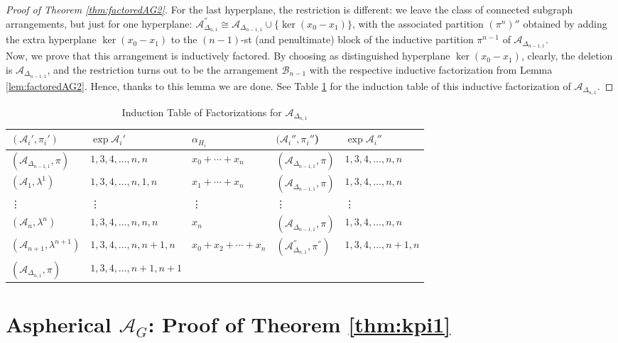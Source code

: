 \documentclass[12pt]{amsart}
\newcommand\CA{{\mathscr A}}
\newcommand\CB{{\mathscr B}}
\numberwithin{equation}{section}
\theoremstyle{plain}
\theoremstyle{definition}
\begin{document}
\begin{proof}[Proof of Theorem \ref{thm:factoredAG2}]
	For the last hyperplane, the restriction is different: we leave the class of connected subgraph arrangements, but just for one hyperplane: $\CA_{\Delta_{n,1}}^{''} \cong \CA_{\Delta_{n-1,1}} \cup \{\ker(x_0-x_1)\}$, with the associated partition $(\pi^n)''$ obtained by adding the extra hyperplane $\ker(x_0-x_1)$ to the $(n-1)$-st (and penultimate) block of the inductive partition $\pi^{n-1}$ of $\CA_{\Delta_{n-1,1}}$. \\

	Now, we prove that this arrangement is inductively factored. By choosing as distinguished hyperplane $\ker(x_0-x_1)$, clearly, the deletion is  $\CA_{\Delta_{n-1,1}}$, and the restriction turns out to be the arrangement $\CB_{n-1}$ with the respective inductive factorization from Lemma \ref{lem:factoredAG2}. Hence, thanks to this lemma  we are done. See Table \ref{table1} for the induction table of this inductive factorization of $\CA_{\Delta_{n,1}}$.
\end{proof}

	\begin{table}[ht!b]
		\renewcommand{\arraystretch}{1.5}
		\begin{tabular}{lllll}\hline
			$(\CA_i',\pi_i')$ &  $\exp\CA_i'$ & $\alpha_{H_i}$ & $(\CA_i'', \pi_i''$) & $\exp\CA_i''$\\
			\hline\hline
			$(\CA_{\Delta_{n-1,1}},\pi)$ &  $1,3,4, \ldots, n, n$ &  $x_0+\cdots +x_n$ & $(\CA_{\Delta_{n-1,1}},\pi)$ & $1,3,4,\ldots, n,n$ \\
			$(\CA_1,\lambda^{1})$ &  $1,3,4, \ldots, n, 1,n$ &  $x_1+\cdots +x_n$ & $(\CA_{\Delta_{n-1,1}},\pi)$ & $1,3,4,\ldots, n,n$ \\
			\vdots & \vdots & \vdots & \vdots & \vdots \\
			$(\CA_n,\lambda^{n})$ &  $1,3,4, \ldots, n,n,n$ &  $x_n$ & $(\CA_{\Delta_{n-1,1}},\pi)$ & $1,3,4,\ldots, n,n$ \\
			$(\CA_{n+1},\lambda^{n+1})$ &  $1,3,4, \ldots, n, n+1,n$ &  $x_0+x_2+\cdots +x_n$ & $(\CA_{\Delta_{n,1}}^{''},\pi^{''})$ & $1,3,4,\ldots, n+1,n$ \\
			$(\CA_{\Delta_{n,1}},\pi)$ &  $1,3,4, \ldots, n+1, n+1$ & & &  \\

			\hline
		\end{tabular}
		\smallskip
		\caption{Induction Table of Factorizations for $\CA_{\Delta_{n,1}}$}
		\label{table1}
	\end{table}

\section{Aspherical $\CA_G$: Proof of Theorem \ref{thm:kpi1}}
\label{s:thm:kpi1}
\end{document}
